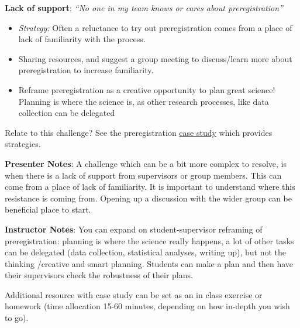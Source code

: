 \documentclass[
  letterpaper,
  DIV=11,
  numbers=noendperiod]{scrartcl}
\begin{document}
\textbf{Lack of support}: \emph{``No one in my team knows or cares about
preregistration''}

\begin{itemize}
\item
  \emph{Strategy:} Often a reluctance to try out preregistration comes
  from a place of lack of familiarity with the process.
\item
  Sharing resources, and suggest a group meeting to discuss/learn more
  about preregistration to increase familiarity.
\item
  Reframe preregistration as a creative opportunity to plan great
  science! Planning is where the science is, as other research
  processes, like data collection can be delegated
\end{itemize}

\begin{tcolorbox}[enhanced jigsaw, arc=.35mm, bottomrule=.15mm, bottomtitle=1mm, breakable, colback=white, colbacktitle=quarto-callout-note-color!10!white, colframe=quarto-callout-note-color-frame, coltitle=black, left=2mm, leftrule=.75mm, opacityback=0, opacitybacktitle=0.6, rightrule=.15mm, title=\textcolor{quarto-callout-note-color}{\faInfo}\hspace{0.5em}{Additional resource}, titlerule=0mm, toprule=.15mm, toptitle=1mm]

Relate to this challenge? See the preregistration
\href{https://zenodo.org/records/22307709}{case study} which provides
strategies.

\end{tcolorbox}

\textbf{Presenter Notes}: A challenge which can be a bit more complex to
resolve, is when there is a lack of support from supervisors or group
members. This can come from a place of lack of familiarity. It is
important to understand where this resistance is coming from. Opening up
a discussion with the wider group can be beneficial place to start.

\textbf{Instructor Notes}: You can expand on student-supervisor
reframing of preregistration: planning is where the science really
happens, a lot of other tasks can be delegated (data collection,
statistical analyses, writing up), but not the thinking /creative and
smart planning. Students can make a plan and then have their supervisors
check the robustness of their plans.

Additional resource with case study can be set as an in class exercise
or homework (time allocation 15-60 minutes, depending on how in-depth
you wish to go).
\end{document}
